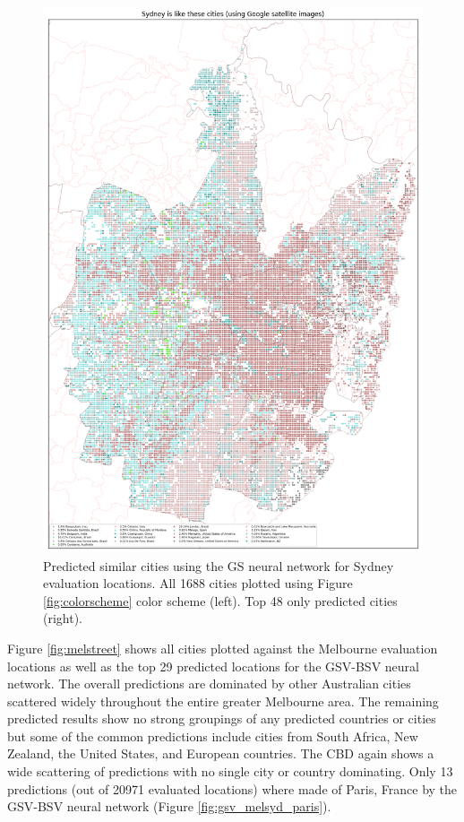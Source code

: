 \documentclass[sageh,times]{sagej}
\begin{document}
\begin{figure}[!htbp]
\includegraphics[scale=0.20]{Images/SydneyOverallAbrev_sat.png} 
\caption{Predicted similar cities using the GS neural network for Sydney evaluation locations. All 1688 cities plotted using Figure \ref{fig:colorscheme} color scheme (left). Top 48 only predicted cities (right).}    
 \label{fig:sydsat}  
\end{figure} 



Figure \ref{fig:melstreet} shows all cities plotted against the Melbourne evaluation locations as well as the top 29 predicted locations for the GSV-BSV neural network. The overall predictions are dominated by other Australian cities scattered widely throughout the entire greater Melbourne area. The remaining predicted results show no strong groupings of any predicted countries or cities but some of the common predictions include cities from South Africa, New Zealand, the United States, and European countries. The CBD again shows a wide scattering of predictions with no single city or country dominating. Only 13 predictions (out of 20971 evaluated locations) where made of Paris, France by the GSV-BSV neural network (Figure \ref{fig:gsv_melsyd_paris}).
\end{document}
